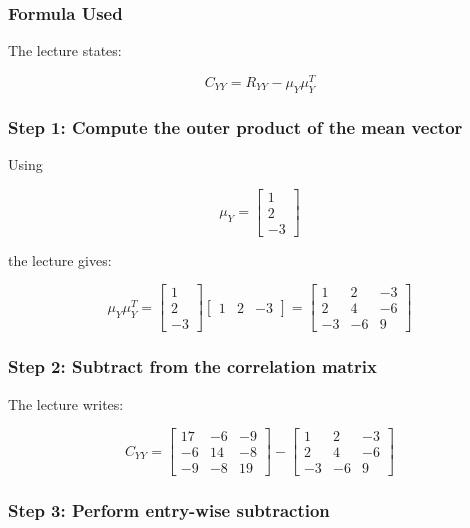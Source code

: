 \documentclass[12pt]{article}
\begin{document}
\subsubsection*{Formula Used}

The lecture states:

\[
C_{YY} = R_{YY} - \mu_Y \mu_Y^T
\]

\subsubsection*{Step 1: Compute the outer product of the mean vector}

Using

\[
\mu_Y =
\begin{bmatrix}
1 \\
2 \\
-3
\end{bmatrix}
\]

the lecture gives:

\[
\mu_Y \mu_Y^T =
\begin{bmatrix}
1 \\
2 \\
-3
\end{bmatrix}
\begin{bmatrix}
1 & 2 & -3
\end{bmatrix}
=
\begin{bmatrix}
1 & 2 & -3 \\
2 & 4 & -6 \\
-3 & -6 & 9
\end{bmatrix}
\]

\subsubsection*{Step 2: Subtract from the correlation matrix}

The lecture writes:

\[
C_{YY} =
\begin{bmatrix}
17 & -6 & -9 \\
-6 & 14 & -8 \\
-9 & -8 & 19
\end{bmatrix}
-
\begin{bmatrix}
1 & 2 & -3 \\
2 & 4 & -6 \\
-3 & -6 & 9
\end{bmatrix}
\]

\subsubsection*{Step 3: Perform entry-wise subtraction}
\end{document}
